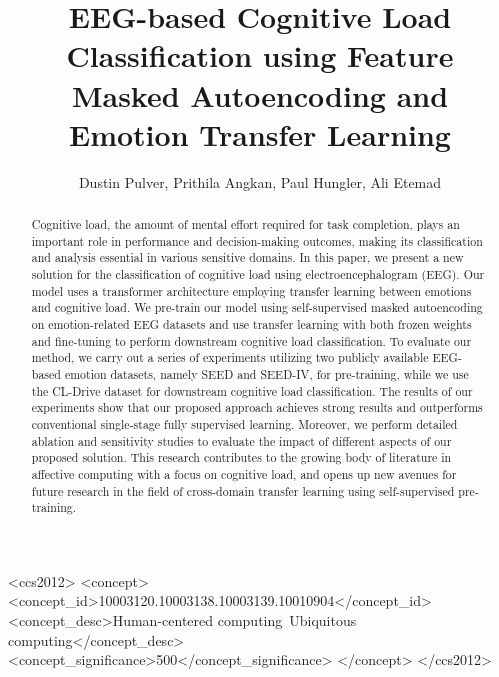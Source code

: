 \documentclass[sigconf]{acmart}
\begin{document}
\fancyhead{}

\title{EEG-based Cognitive Load Classification using Feature Masked Autoencoding and Emotion Transfer Learning}

\author{Dustin Pulver, Prithila Angkan, Paul Hungler, Ali Etemad}


\renewcommand{\shortauthors}{Trovato and Tobin, et al.}


\begin{abstract}
Cognitive load, the amount of mental effort required for task completion, plays an important role in performance and decision-making outcomes, making its classification and analysis essential in various sensitive domains. In this paper, we present a new solution for the classification of cognitive load using electroencephalogram (EEG). Our model uses a transformer architecture employing transfer learning between emotions and cognitive load. We pre-train our model using self-supervised masked autoencoding on emotion-related EEG datasets and use transfer learning with both frozen weights and fine-tuning to perform downstream cognitive load classification. To evaluate our method, we carry out a series of experiments utilizing two publicly available EEG-based emotion datasets, namely SEED and SEED-IV, for pre-training, while we use the CL-Drive dataset for downstream cognitive load classification. The results of our experiments show that our proposed approach achieves strong results and outperforms conventional single-stage fully supervised learning. Moreover, we perform detailed ablation and sensitivity studies to evaluate the impact of different aspects of our proposed solution. This research contributes to the growing body of literature in affective computing with a focus on cognitive load, and opens up new avenues for future research in the field of cross-domain transfer learning using self-supervised pre-training.
\end{abstract}


\begin{CCSXML}
<ccs2012>
   <concept>
       <concept_id>10003120.10003138.10003139.10010904</concept_id>
       <concept_desc>Human-centered computing~Ubiquitous computing</concept_desc>
       <concept_significance>500</concept_significance>
       </concept>
 </ccs2012>
\end{CCSXML}
\end{document}

